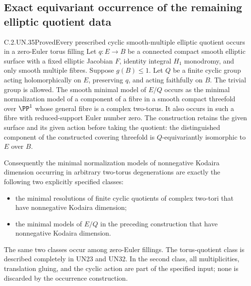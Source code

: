 \subsection{Exact equivariant occurrence of the remaining elliptic quotient data}

\begin{statement}{C.2.UN.35}{Proved}{Every prescribed cyclic smooth-multiple elliptic quotient occurs in a zero-Euler torus filling}
Let $q:E\to B$ be a connected compact smooth elliptic
surface with a fixed elliptic Jacobian $F$, identity
integral $H_1$ monodromy, and only smooth multiple
fibres. Suppose $g(B)\le1$. Let $Q$ be a finite
cyclic group acting holomorphically on $E$, preserving
$q$, and acting faithfully on $B$. The trivial group
is allowed. The smooth minimal model of $E/Q$ occurs
as the minimal normalization model of a component of
a fibre in a smooth compact threefold over $\PP^1$
whose general fibre is a complex two-torus. It also
occurs in such a fibre with reduced-support Euler
number zero. The construction retains the given
surface and its given action before taking the
quotient: the distinguished component of the
constructed covering threefold is $Q$-equivariantly
isomorphic to $E$ over $B$.

Consequently the minimal normalization models of
nonnegative Kodaira dimension occurring in arbitrary
two-torus degenerations are exactly the following
two explicitly specified classes:
\begin{itemize}
\item the minimal resolutions of finite cyclic
quotients of complex two-tori that have nonnegative
Kodaira dimension;
\item the minimal models of $E/Q$ in the preceding
construction that have nonnegative Kodaira dimension.
\end{itemize}
The same two classes occur among zero-Euler fillings.
The torus-quotient class is described completely in
UN23 and UN32. In the second class, all multiplicities,
translation gluing, and the cyclic action are part
of the specified input; none is discarded by the
occurrence construction.
\end{statement}

